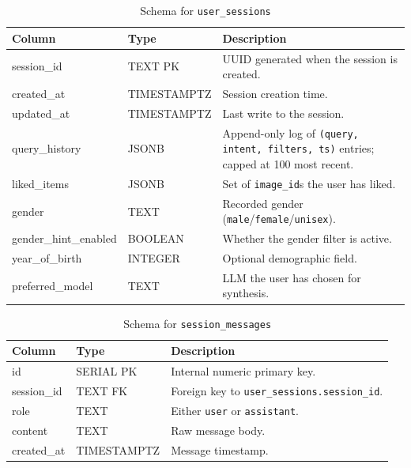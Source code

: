 \begin{table}[H]
\centering
\begin{tabular}{p{4cm}p{2.5cm}p{7.3cm}}
\toprule
\textbf{Column} & \textbf{Type} & \textbf{Description}\\
\midrule
session\_id           & TEXT PK     & UUID generated when the session is created.\\
created\_at           & TIMESTAMPTZ & Session creation time.\\
updated\_at           & TIMESTAMPTZ & Last write to the session.\\
query\_history        & JSONB       & Append-only log of \texttt{(query, intent, filters, ts)} entries; capped at 100 most recent.\\
liked\_items          & JSONB       & Set of \texttt{image\_id}s the user has liked.\\
gender                & TEXT        & Recorded gender (\texttt{male}/\texttt{female}/\texttt{unisex}).\\
gender\_hint\_enabled & BOOLEAN     & Whether the gender filter is active.\\
year\_of\_birth       & INTEGER     & Optional demographic field.\\
preferred\_model      & TEXT        & LLM the user has chosen for synthesis.\\
\bottomrule
\end{tabular}
\caption{Schema for \texttt{user\_sessions}}
\label{tab:schema_sessions}
\end{table}

\begin{table}[H]
\centering
\begin{tabular}{p{3.2cm}p{2.5cm}p{8.1cm}}
\toprule
\textbf{Column} & \textbf{Type} & \textbf{Description}\\
\midrule
id          & SERIAL PK   & Internal numeric primary key.\\
session\_id & TEXT FK     & Foreign key to \texttt{user\_sessions.session\_id}.\\
role        & TEXT        & Either \texttt{user} or \texttt{assistant}.\\
content     & TEXT        & Raw message body.\\
created\_at & TIMESTAMPTZ & Message timestamp.\\
\bottomrule
\end{tabular}
\caption{Schema for \texttt{session\_messages}}
\label{tab:schema_messages}
\end{table}

